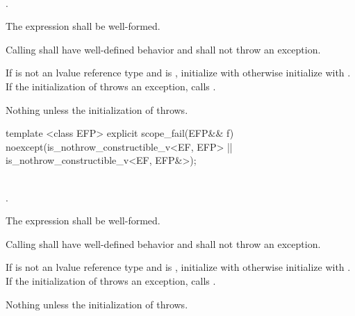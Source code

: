 \documentclass[ebook,11pt,article]{memoir}
\begin{document}
\begin{itemdescr}
\pnum
\constraints
 \tcode{\&\&}\\
.

\pnum
\mandates %
The expression  shall be well-formed.

\pnum
\expects
Calling  shall have well-defined behavior and shall not throw an exception.

\pnum
\effects If  is not an lvalue reference type and  is , initialize   with  otherwise initialize  with . 
If the initialization of  throws an exception, calls .

\pnum
\throws Nothing unless the initialization of  throws.

\end{itemdescr}


\begin{itemdecl}
template <class EFP>
explicit
scope_fail(EFP&& f) noexcept(is_nothrow_constructible_v<EF, EFP>
                          || is_nothrow_constructible_v<EF, EFP&>);

\end{itemdecl}

\begin{itemdescr}
\pnum
\constraints  
 \tcode{\&\&}\\ .

\pnum
\mandates 
The expression  shall be well-formed.

\pnum
\expects
Calling  shall have well-defined behavior and shall not throw an exception.

\pnum
\effects If  is not an lvalue reference type and  is , initialize   with  otherwise initialize  with . If the initialization of  throws an exception, calls .

\pnum
\throws Nothing unless the initialization of  throws.

\end{itemdescr}
\end{document}
